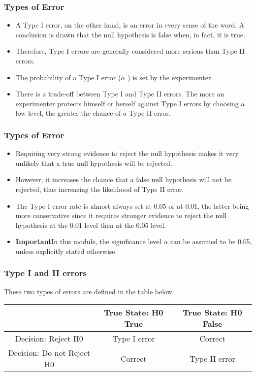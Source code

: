 ﻿\documentclass[a4]{beamer}
\begin{document}
\begin{frame}
\frametitle{Types of Error}
\large
\begin{itemize}
\item
A Type I error, on the other hand, is an error in every sense of the word. A conclusion is drawn that the null hypothesis is false when, in fact, it is true. \item Therefore, Type I errors are generally considered more serious than Type II errors.
\item
The probability of a Type I error ($\alpha$ ) is set by the experimenter. \item There is a trade-off between Type I and Type II errors. The more an experimenter protects himself or herself against Type I errors by choosing a low level, the greater the chance of a Type II error.
\end{itemize}
\end{frame}
\begin{frame}
\frametitle{Types of Error}
\large
\begin{itemize}
\item
Requiring very strong evidence to reject the null hypothesis makes it very unlikely that a true null hypothesis will be rejected. \item However, it increases the chance that a false null hypothesis will not be rejected, thus increasing the likelihood of Type II error.
\item
The Type I error rate is almost always set at 0.05 or at 0.01, the latter being more conservative since it requires stronger evidence to reject the null hypothesis at the 0.01 level then at the 0.05 level.
\item \textbf{Important}In this module, the significance level $\alpha$ can be assumed to be 0.05, unless explicitly stated otherwise.
\end{itemize}
\end{frame}
\begin{frame}
\frametitle{Type I and II errors}
\large
These two types of errors are defined in the table below.
\small
\begin{center}
\begin{tabular}{|c|c|c|}
\hline
&True State: H0 True & True State: H0 False\\\hline
Decision: Reject H0 & Type I error& Correct\\\hline
Decision: Do not Reject H0 & Correct &Type II error\\ \hline
\end{tabular}
\end{center}
\end{frame}
\end{document}
